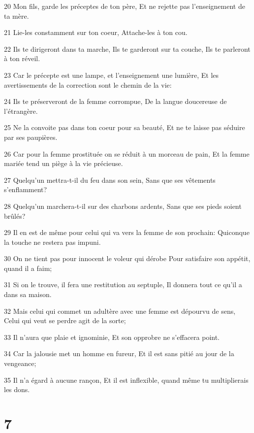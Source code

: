 \par 20 Mon fils, garde les préceptes de ton père, Et ne rejette pas l'enseignement de ta mère.
\par 21 Lie-les constamment sur ton coeur, Attache-les à ton cou.
\par 22 Ils te dirigeront dans ta marche, Ils te garderont sur ta couche, Ils te parleront à ton réveil.
\par 23 Car le précepte est une lampe, et l'enseignement une lumière, Et les avertissements de la correction sont le chemin de la vie:
\par 24 Ils te préserveront de la femme corrompue, De la langue doucereuse de l'étrangère.
\par 25 Ne la convoite pas dans ton coeur pour sa beauté, Et ne te laisse pas séduire par ses paupières.
\par 26 Car pour la femme prostituée on se réduit à un morceau de pain, Et la femme mariée tend un piège à la vie précieuse.
\par 27 Quelqu'un mettra-t-il du feu dans son sein, Sans que ses vêtements s'enflamment?
\par 28 Quelqu'un marchera-t-il sur des charbons ardents, Sans que ses pieds soient brûlés?
\par 29 Il en est de même pour celui qui va vers la femme de son prochain: Quiconque la touche ne restera pas impuni.
\par 30 On ne tient pas pour innocent le voleur qui dérobe Pour satisfaire son appétit, quand il a faim;
\par 31 Si on le trouve, il fera une restitution au septuple, Il donnera tout ce qu'il a dans sa maison.
\par 32 Mais celui qui commet un adultère avec une femme est dépourvu de sens, Celui qui veut se perdre agit de la sorte;
\par 33 Il n'aura que plaie et ignominie, Et son opprobre ne s'effacera point.
\par 34 Car la jalousie met un homme en fureur, Et il est sans pitié au jour de la vengeance;
\par 35 Il n'a égard à aucune rançon, Et il est inflexible, quand même tu multiplierais les dons.

\chapter{7}

